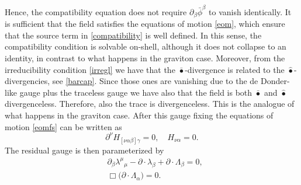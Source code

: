 \documentclass[a4paper,12pt]{article}
\begin{document}
Hence, the compatibility equation does not require
\(\partial_{\beta}\bar{\phi}^{\beta}\) to vanish identically.
It is sufficient that the field satisfies the equations of motion
\eqref{eom}, which ensure that the source term in
\eqref{compatibility}
is well defined.
In this sense, the compatibility condition is solvable
on-shell, although it does not collapse to an identity, in contrast to what happens in the graviton case. Moreover, from the irreducibility condition \eqref{irregl} we have that the $\bar{\bullet}$-divergence is related to the $\hat{\bullet}$-divergencies, see \eqref{barcap}. Since those ones are vanishing due to the de Donder-like gauge plus the traceless gauge we have also that the field is both $\bar{\bullet}$ and $\hat{\bullet}$ divergenceless. Therefore, also the trace is divergenceless. This is the analogue of what happens in the graviton case. After this gauge fixing the equations of motion \eqref{eomfs} can be written as
\begin{equation}
    \partial^{\nu}H_{[\nu \alpha \beta] \gamma}=0, \quad H_{\nu \alpha}=0.
    \label{eqfix}
\end{equation} 
The residual gauge is then parameterized by 
\begin{equation}
\begin{aligned}
     &\partial_{\beta}\lambda^{\mu}{}_{\mu}
-\partial\!\cdot\!\lambda_{\beta}
+\partial\!\cdot\!\Lambda_{\beta}=0,\\
&\Box\bigl(\partial\!\cdot\!\Lambda_{\alpha}\bigr)=0.
\label{resgauge}
\end{aligned}
\end{equation}
\end{document}
